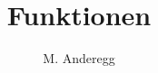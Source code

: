 \documentclass[a4paper, 11pt]{article}
\begin{document}
\title{Funktionen}
\author{M. Anderegg}
\date{} %
\maketitle



\clearpage

\clearpage

\clearpage

\end{document}

